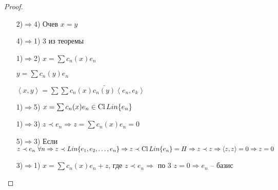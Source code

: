 \begin{proof}\thmslashn
	
	\begin{enumerate}
		\item[2)$\Rightarrow$4)]
		Очев $x = y$
		
		\item[4)$\Rightarrow$1)]
		3 из теоремы
		
		\item[1)$\Rightarrow$2)]
		$x = \sum c_n(x)e_n$
		
		$y = \sum c_n(y)e_n$
		
		$\left\langle x, y\right\rangle = \sum\sum c_n(x)\bar{c_n(y)} \left\langle e_n, e_k\right\rangle $
		
		\item[1)$\Rightarrow$5)]
		$x = \sum c_n(x)e_n \in \operatorname{Cl} Lin\{e_n\}$
		
		\item[1)$\Rightarrow$3)]
		$z\prec e_n \Rightarrow z = \sum c_n(x)e_n = 0$
		
		\item[5)$\Rightarrow$3)]
		Если $z \prec e_n \,\,\forall n \Rightarrow z\prec Lin\{e_1, e_2, \ldots, e_n\} \Rightarrow z\prec \operatorname{Cl} Lin\{e_n\} = H \Rightarrow z\prec z \Rightarrow \left\langle z, z\right\rangle = 0 \Rightarrow z = 0$
		
		\item[3)$\Rightarrow$1)]
		$x = \sum c_n(x)e_n + z$, где $z \prec e_n \Rightarrow$ по 3 $z = 0 \Rightarrow e_n$ -- базис
		
		
	\end{enumerate}	
	
\end{proof}
